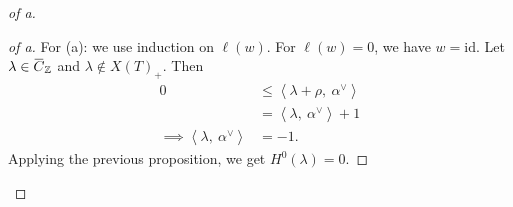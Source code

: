 \begin{proof}[of a]

\begin{proof}[of a]

For (a): we use induction on \(\ell(w)\). For \(\ell(w) = 0\), we have
\(w = \text{id}\). Let
\(\lambda \in \mkern 1.5mu\overline{\mkern-1.5muC\mkern-1.5mu}\mkern 1.5mu_{\mathbb{Z}}\)
and \(\lambda\not\in X(T)_+\). Then
\begin{align*}   0  &\leq {\left\langle {\lambda + \rho},~{\alpha^\vee} \right\rangle} \\ &= {\left\langle {\lambda},~{\alpha^\vee} \right\rangle} + 1 \\ \implies {\left\langle {\lambda},~{\alpha^\vee} \right\rangle} &= -1 .\end{align*}
Applying the previous proposition, we get \(H^0(\lambda) = 0\).

\end{proof}

\end{proof}

